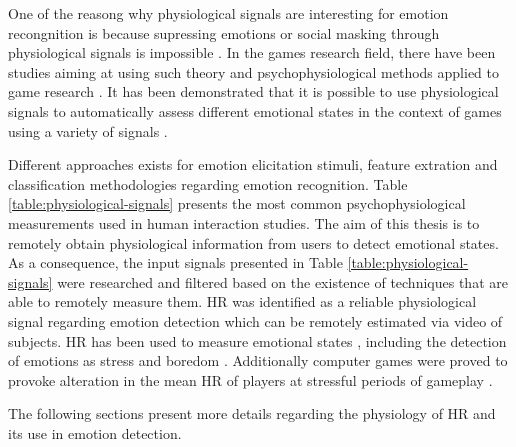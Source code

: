 One of the reasong why physiological signals are interesting for emotion recongnition is because supressing emotions or social masking through physiological signals is impossible \parencite{kim2004emotion}. In the games research field, there have been studies aiming at using such theory and psychophysiological methods applied to game research \parencite{kivikangas2011review}. It has been demonstrated that it is possible to use physiological signals to automatically assess different emotional states in the context of games using a variety of signals \parencite{bousefsaf2013remote,yun2009game,rani2006empirical,tijs2008dynamic}.

Different approaches exists for emotion elicitation stimuli, feature extration and classification methodologies regarding emotion recognition. Table \ref{table:physiological-signals} presents the most common psychophysiological measurements used in human interaction studies. The aim of this thesis is to remotely obtain physiological information from users to detect emotional states. As a consequence, the input signals presented in Table \ref{table:physiological-signals} were researched and filtered based on the existence of techniques that are able to remotely measure them. HR was identified as a reliable physiological signal regarding emotion detection which can be remotely estimated via video of subjects. HR has been used to measure emotional states \parencite{kivikangas2011review}, including the detection of emotions as stress \parencite{choi2009using} and boredom \parencite{yamakoshi2007preliminary}. Additionally computer games were proved to provoke alteration in the mean HR of players at stressful periods of gameplay \parencite{sharma2006assessment,rodriguez2015vr}.

The following sections present more details regarding the physiology of HR and its use in emotion detection.


